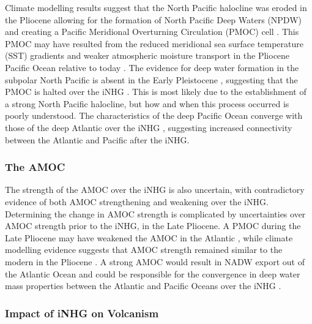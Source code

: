 Climate modelling results suggest that the North Pacific halocline was eroded in the Pliocene allowing for the formation of North Pacific Deep Waters (NPDW) and creating a Pacific Meridional Overturning Circulation (PMOC) cell \citep{burlsActivePacificMeridional2017}. This PMOC may have resulted from the reduced meridional sea surface temperature (SST) gradients and weaker atmospheric moisture transport in the Pliocene Pacific Ocean relative to today \citep{burlsActivePacificMeridional2017}. The evidence for deep water formation in the subpolar North Pacific is absent in the Early Pleistocene \citep{swannSalinityChangesNorth2010}, suggesting that the PMOC is halted over the iNHG \citep{burlsActivePacificMeridional2017}. This is most likely due to the establishment of a strong North Pacific halocline, but how and when this process occurred is poorly understood. The characteristics of the deep Pacific Ocean converge with those of the deep Atlantic over the iNHG \citep{woodardAntarcticRoleNorthern2014}, suggesting increased connectivity between the Atlantic and Pacific after the iNHG.

\subsubsection{The AMOC}

The strength of the AMOC over the iNHG is also uncertain, with contradictory evidence of both AMOC strengthening \citep{hayashiLatestPlioceneNorthern2020} and weakening \citep{langIncursionsSouthernsourcedWater2016} over the iNHG. Determining the change in AMOC strength is complicated by uncertainties over AMOC strength prior to the iNHG, in the Late Pliocene. A PMOC during the Late Pliocene may have weakened the AMOC in the Atlantic \citep{ferreiraAtlanticPacificAsymmetryDeep2018}, while climate modelling evidence suggests that AMOC strength remained similar to the modern in the Pliocene \citep{zhangMidplioceneAtlanticMeridional2013}. A strong AMOC would result in NADW export out of the Atlantic Ocean and could be responsible for the convergence in deep water mass properties between the Atlantic and Pacific Oceans over the iNHG \citep{kwiekPacificOceanIntermediate1999, woodardAntarcticRoleNorthern2014}.

\subsubsection{Impact of iNHG on Volcanism}

